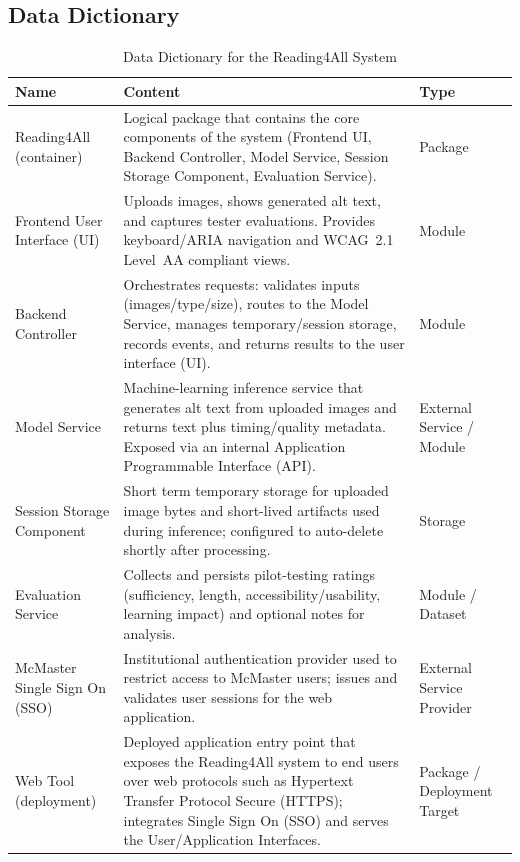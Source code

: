 \documentclass[12pt]{article}
\begin{document}
\subsection{Data Dictionary}
\begin{table}[H]
    \centering
    \caption{Data Dictionary for the Reading4All System}
    \label{tab:data-dictionary-reading4all}
    \begin{tabular}{ |p{3.6cm}|p{7.4cm}|p{3.0cm}| }
      \hline
      \textbf{Name} & \textbf{Content} & \textbf{Type} \\
      \hline
      Reading4All (container) &
      Logical package that contains the core components of the system (Frontend UI, Backend Controller, Model Service, Session Storage Component, Evaluation Service). &
      Package \\
      \hline
      Frontend User Interface (UI) &
      Uploads images, shows generated alt text, and captures tester evaluations. Provides keyboard/ARIA navigation and WCAG~2.1 Level~AA compliant views. &
      Module \\
      \hline
      Backend Controller &
      Orchestrates requests: validates inputs (images/type/size), routes to the Model Service, manages temporary/session storage, records events, and returns results to the user interface (UI). &
      Module \\
      \hline
      Model Service &
      Machine-learning inference service that generates alt text from uploaded images and returns text plus timing/quality metadata. Exposed via an internal Application Programmable Interface (API). &
      External Service / Module \\
      \hline
      Session Storage Component &
      Short term temporary storage for uploaded image bytes and short-lived artifacts used during inference; configured to auto-delete shortly after processing. &
      Storage \\
      \hline
      Evaluation Service &
      Collects and persists pilot-testing ratings (sufficiency, length, accessibility/usability, learning impact) and optional notes for analysis. &
      Module / Dataset \\
      \hline
      McMaster Single Sign On (SSO) &
      Institutional authentication provider used to restrict access to McMaster users; issues and validates user sessions for the web application. &
      External Service Provider \\
      \hline
      Web Tool (deployment) &
      Deployed application entry point that exposes the Reading4All system to end users over web protocols such as Hypertext Transfer Protocol Secure (HTTPS); integrates Single Sign On (SSO) and serves the User/Application Interfaces. &
      Package / Deployment Target \\
      \hline
    \end{tabular}
  \end{table}
  
\end{document}
